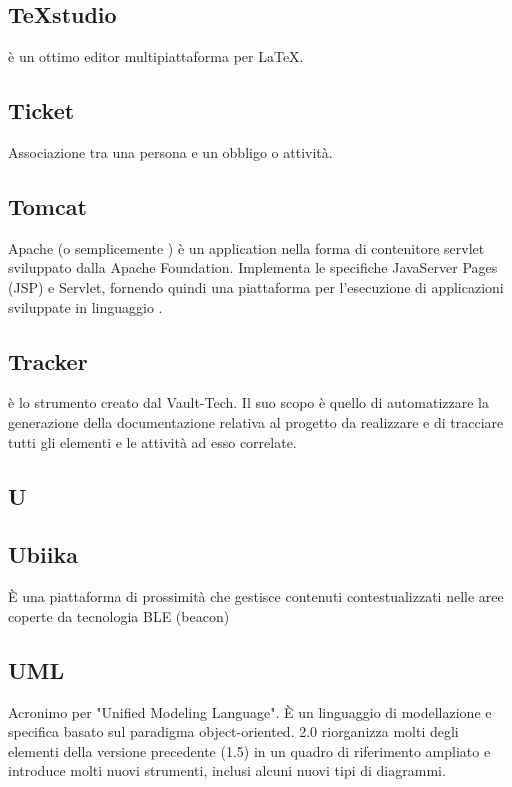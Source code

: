 \subsection*{TeXstudio}
 è un ottimo editor multipiattaforma per LaTeX.

\subsection*{Ticket}
Associazione tra una persona e un obbligo o attività.

\subsection*{Tomcat}
Apache  (o semplicemente ) è un application  nella forma di contenitore servlet  sviluppato dalla Apache  Foundation. Implementa le specifiche JavaServer Pages (JSP) e Servlet, fornendo quindi una piattaforma  per l'esecuzione di applicazioni  sviluppate in linguaggio . 

\subsection*{Tracker}
 è lo strumento  creato dal  Vault-Tech. Il suo scopo è quello di automatizzare la generazione della documentazione relativa al progetto da realizzare e di tracciare tutti gli elementi e le attività ad esso correlate.

\newpage

\begin{center}
\Huge\section*{\uppercase{U}}
\end{center}

\subsection*{Ubiika}
È una piattaforma di prossimità che gestisce contenuti contestualizzati nelle
aree coperte da tecnologia BLE (beacon)​

\subsection*{UML}
Acronimo per "Unified Modeling Language". È un linguaggio di modellazione e
specifica basato sul paradigma object-oriented.  2.0 riorganizza molti degli
elementi della versione precedente (1.5) in un quadro di riferimento ampliato e
introduce molti nuovi strumenti, inclusi alcuni nuovi tipi di diagrammi.

